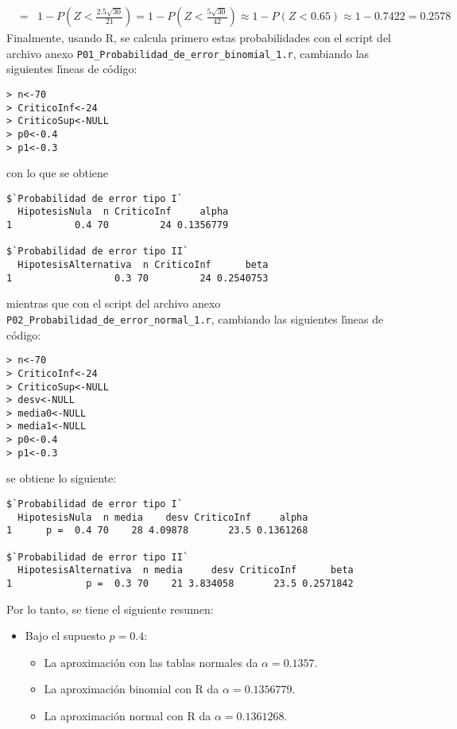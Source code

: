 \begin{solucion}
\begin{eqnarray*}
  & = & 1 - P\left( Z < \frac{2.5\sqrt{30}}{21} \right) = 1 - P\left( Z < \frac{5\sqrt{30}}{42} \right) \approx 1 - P(Z < 0.65) \approx 1 - 0.7422 = 0.2578
 \end{eqnarray*}
 Finalmente, usando R, se calcula primero estas probabilidades con el script del archivo anexo \texttt{P01\_Probabilidad\_de\_error\_binomial\_1.r}, cambiando las siguientes l\'{\i}neas de c\'odigo:
 \begin{verbatim}
> n<-70
> CriticoInf<-24
> CriticoSup<-NULL
> p0<-0.4
> p1<-0.3
 \end{verbatim}
 \vspace{-0.5cm}
 con lo que se obtiene
 \begin{verbatim}
$`Probabilidad de error tipo I`
  HipotesisNula  n CriticoInf     alpha
1           0.4 70         24 0.1356779

$`Probabilidad de error tipo II`
  HipotesisAlternativa  n CriticoInf      beta
1                  0.3 70         24 0.2540753
 \end{verbatim}
 \vspace{-0.5cm}
 mientras que con el script del archivo anexo \texttt{P02\_Probabilidad\_de\_error\_normal\_1.r}, cambiando las siguientes l\'{\i}neas de c\'odigo:
 \begin{verbatim}
> n<-70
> CriticoInf<-24
> CriticoSup<-NULL
> desv<-NULL
> media0<-NULL
> media1<-NULL
> p0<-0.4
> p1<-0.3
 \end{verbatim}
 \vspace{-0.5cm}
 se obtiene lo siguiente:
 \begin{verbatim}
$`Probabilidad de error tipo I`
  HipotesisNula  n media    desv CriticoInf     alpha
1      p =  0.4 70    28 4.09878       23.5 0.1361268

$`Probabilidad de error tipo II`
  HipotesisAlternativa  n media     desv CriticoInf      beta
1             p =  0.3 70    21 3.834058       23.5 0.2571842
 \end{verbatim}
 \vspace{-0.5cm}
 Por lo tanto, se tiene el siguiente resumen:
 \begin{itemize}
  \item Bajo el supuesto $p = 0.4$:
  \begin{itemize}
   \item La aproximaci\'on con las tablas normales da $\alpha = 0.1357$.
   \item La  aproximaci\'on binomial con R da $\alpha = 0.1356779$.
   \item La aproximaci\'on normal con R da $\alpha = 0.1361268$.
  \end{itemize}


\end{itemize}
\end{solucion}
